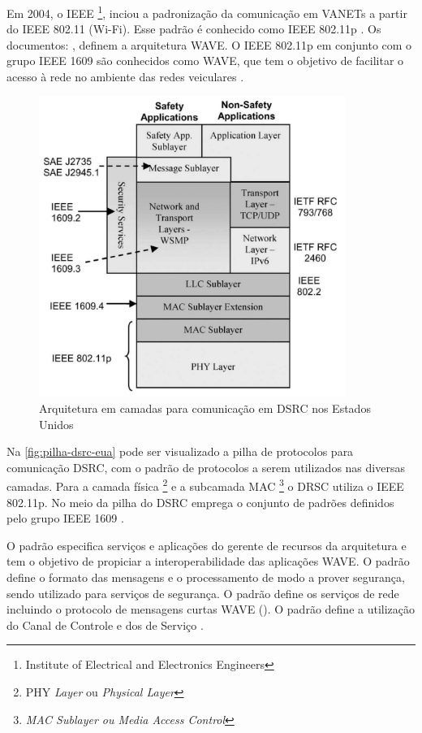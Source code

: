 \documentclass[mestrado, pre-defesa, english, brazil]{packages/icmc}
\begin{document}
Em 2004, o IEEE \footnote{Institute of Electrical and Electronics Engineers}, inciou a padronização da comunicação em VANETs a partir do IEEE 802.11 (Wi-Fi). Esse padrão é conhecido como IEEE 802.11p . Os documentos: \citeauthor{IEEE-Std-802.11,IEEE-Std-802.11p,IEEE-Std-1609.1,IEEE-Std-1609.2,IEEE-Std-1609.3,IEEE-Std-1609.4}, definem a arquitetura WAVE. O IEEE 802.11p em conjunto com o grupo IEEE 1609 são conhecidos como WAVE, que tem o objetivo de facilitar o acesso à rede no ambiente das redes veiculares \cite{kenney-2011,Alves-2009,sattari-2012,Yokoyama-2014}.

\begin{figure}[!htbp]
    \centering
    \caption{\label{fig:pilha-dsrc-eua} Arquitetura em camadas para comunicação em DSRC nos Estados Unidos}
    \includegraphics[width=10cm]{img/pilha-dsrc-eua.jpeg}
\end{figure}

Na \autoref{fig:pilha-dsrc-eua} pode ser visualizado a pilha de protocolos para comunicação DSRC, com o padrão de protocolos a serem utilizados nas diversas camadas. Para a camada física \footnote{PHY \textit{Layer} ou \textit{Physical Layer}} e a 
subcamada MAC \footnote{\textit{MAC Sublayer ou Media Access Control}} o DRSC utiliza o IEEE 802.11p. No meio da pilha do DSRC emprega o conjunto de padrões definidos pelo grupo IEEE 1609 \cite{li-2012,kenney-2011}.

O padrão \citeauthor{IEEE-Std-1609.1} especifica serviços e aplicações do gerente de recursos da arquitetura e tem o objetivo de propiciar a interoperabilidade das aplicações WAVE. O padrão \citeauthor{IEEE-Std-1609.2} define o formato das mensagens e o processamento de modo a prover segurança, sendo utilizado para serviços de segurança. O padrão \citeauthor{IEEE-Std-1609.3} define os serviços de rede incluindo o protocolo de mensagens curtas WAVE (). O padrão \citeauthor{IEEE-Std-1609.4} define a utilização do Canal de Controle e dos de Serviço \cite{kenney-2011,Alves-2009}.
\end{document}
